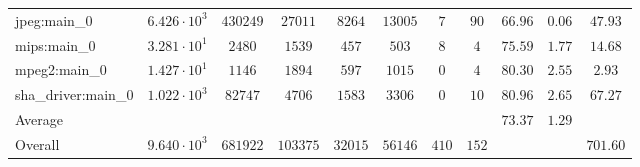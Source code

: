 \begin{tabular}{|l|c|c|c|c|c|c|c|c|c|c|}
jpeg:main\_0            & $ 6.426 \cdot 10^{3} $ & $ 430249 $ & $ 27011  $ & $ 8264  $ & $ 13005 $ & $ 7   $ & $ 90  $ & $ 66.96       $ & $ 0.06    $ & $ 47.93   $ \\
mips:main\_0            & $ 3.281 \cdot 10^{1} $ & $ 2480   $ & $ 1539   $ & $ 457   $ & $ 503   $ & $ 8   $ & $ 4   $ & $ 75.59       $ & $ 1.77    $ & $ 14.68   $ \\
mpeg2:main\_0           & $ 1.427 \cdot 10^{1} $ & $ 1146   $ & $ 1894   $ & $ 597   $ & $ 1015  $ & $ 0   $ & $ 4   $ & $ 80.30       $ & $ 2.55    $ & $ 2.93    $ \\
sha\_driver:main\_0     & $ 1.022 \cdot 10^{3} $ & $ 82747  $ & $ 4706   $ & $ 1583  $ & $ 3306  $ & $ 0   $ & $ 10  $ & $ 80.96       $ & $ 2.65    $ & $ 67.27   $ \\
\hline
Average                 & $                    $ & $        $ & $        $ & $       $ & $       $ & $     $ & $     $ & $ 73.37       $ & $ 1.29    $ & $         $ \\
\hline
Overall                 & $ 9.640 \cdot 10^{3} $ & $ 681922 $ & $ 103375 $ & $ 32015 $ & $ 56146 $ & $ 410 $ & $ 152 $ & $             $ & $         $ & $ 701.60  $ \\
\hline
\end{tabular}
